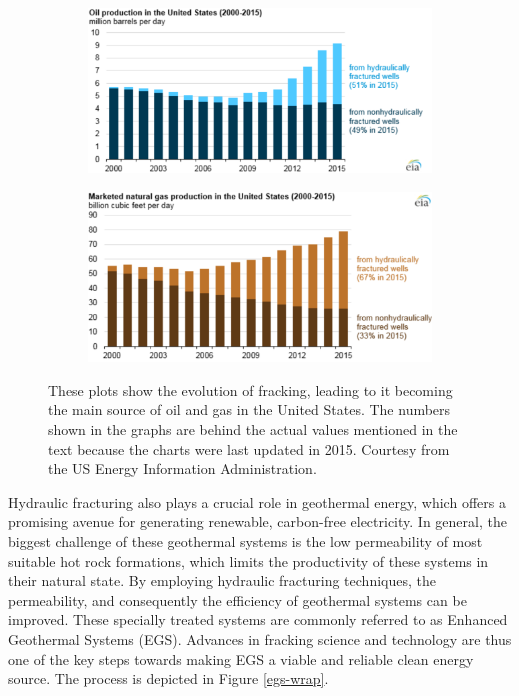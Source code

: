 \begin{figure}[h]
    \begin{subfigure}{.49\textwidth}
      \centering
      \includegraphics[width=\linewidth]{Chapter1/oil_from_fracs.png}
      \label{fig:oil_fracs}
    \end{subfigure}%
    \begin{subfigure}{.49\textwidth}
      \centering
      \includegraphics[width=\linewidth]{Chapter1/gas_from_fracs.png}
      \label{fig:gas_fracs}
    \end{subfigure}%
      \caption{These plots show the evolution of fracking, leading to it becoming the main source of oil and gas in the United States. The numbers shown in the graphs are behind the actual values mentioned in the text because the charts were last updated in 2015. Courtesy from the US Energy Information Administration.}
\end{figure}\label{oil_and_gas_production}

Hydraulic fracturing also plays a crucial role in geothermal energy, which offers a promising avenue for generating renewable, carbon-free electricity. In general, the biggest challenge of these geothermal systems is the low permeability of most suitable hot rock formations, which limits the productivity of these systems in their natural state. By employing hydraulic fracturing techniques, the permeability, and consequently the efficiency of geothermal systems can be improved. These specially treated systems are commonly referred to as Enhanced Geothermal Systems (EGS). Advances in fracking science and technology are thus one of the key steps towards making EGS a viable and reliable clean energy source. The process is depicted in Figure \ref{egs-wrap}.

